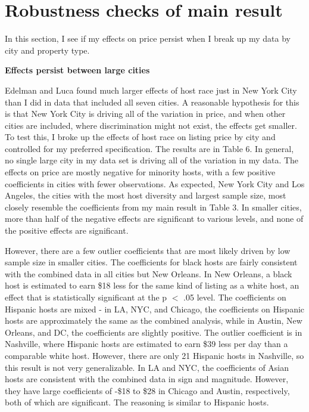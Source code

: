 \documentclass[11pt, oneside]{article}
\begin{document}
\section{Robustness checks of main result} %

In this section, I see if my effects on price persist when I break up my data by city and property type. 

\textbf{Effects persist between large cities}

Edelman and Luca found much larger effects of host race just in New York City than I did in data that included all seven cities. A reasonable hypothesis for this is that New York City is driving all of the variation in price, and when other cities are included, where discrimination might not exist, the effects get smaller. To test this, I broke up the effects of host race on listing price by city and controlled for my preferred specification. The results are in Table 6. In general, no single large city in my data set is driving all of the variation in my data. The effects on price are mostly negative for minority hosts, with a few positive coefficients in cities with fewer observations. As expected, New York City and Los Angeles, the cities with the most host diversity and largest sample size, most closely resemble the coefficients from my main result in Table 3. In smaller cities, more than half of the negative effects are significant to various levels, and none of the positive effects are significant. 

However, there are a few outlier coefficients that are most likely driven by low sample size in smaller cities. The coefficients for black hosts are fairly consistent with the combined data in all cities but New Orleans. In New Orleans, a black host is estimated to earn \$18 less for the same kind of listing as a white host, an effect that is statistically significant at the p $<$ .05 level. The coefficients on Hispanic hosts are mixed - in LA, NYC, and Chicago, the coefficients on Hispanic hosts are approximately the same as the combined analysis, while in Austin, New Orleans, and DC, the coefficients are slightly positive. The outlier coefficient is in Nashville, where Hispanic hosts are estimated to earn \$39 less per day than a comparable white host. However, there are only 21 Hispanic hosts in Nashville, so this result is not very generalizable. In LA and NYC, the coefficients of Asian hosts are consistent with the combined data in sign and magnitude. However, they have large coefficients of -\$18 to \$28 in Chicago and Austin, respectively, both of which are significant. The reasoning is similar to Hispanic hosts. 
\end{document}
